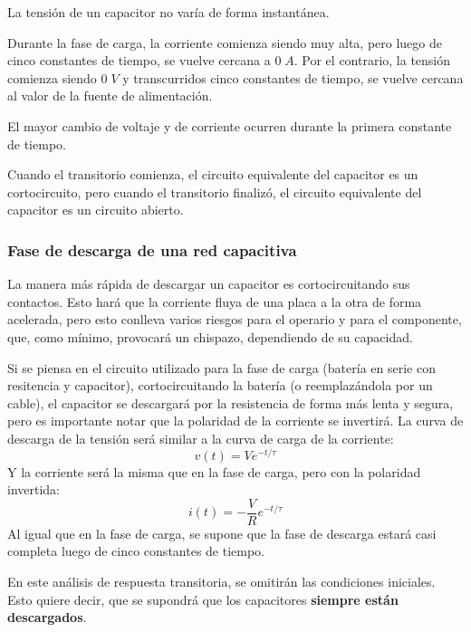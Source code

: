 \begin{conclusiones}
	La tensión de un capacitor no varía de forma instantánea.
		
	Durante la fase de carga, la corriente comienza siendo muy alta, pero luego de cinco constantes de tiempo, se vuelve cercana a $0\; A$. Por el contrario, la tensión comienza siendo $0\; V$ y transcurridos cinco constantes de tiempo, se vuelve cercana al valor de la fuente de alimentación.
	
	El mayor cambio de voltaje y de corriente ocurren durante la primera constante de tiempo.
	
	Cuando el transitorio comienza, el circuito equivalente del capacitor es un cortocircuito, pero cuando el transitorio finalizó, el circuito equivalente del capacitor es un circuito abierto.
\end{conclusiones}
\subsubsection{Fase de descarga de una red capacitiva}
La manera más rápida de descargar un capacitor es cortocircuitando sus contactos. Esto hará que la corriente fluya de una placa a la otra de forma acelerada, pero esto conlleva varios riesgos para el operario y para el componente, que, como mínimo, provocará un chispazo, dependiendo de su capacidad.

Si se piensa en el circuito utilizado para la fase de carga (batería en serie con resitencia y capacitor), cortocircuitando la batería (o reemplazándola por un cable), el capacitor se descargará por la resistencia de forma más lenta y segura, pero es importante notar que la polaridad de la corriente se invertirá. La curva de descarga de la tensión será similar a la curva de carga de la corriente:
\begin{equation}
	\label{eq:descarga_capacitor_v}
	v(t)=Ve^{-t / \tau}
\end{equation}
Y la corriente será la misma que en la fase de carga, pero con la polaridad invertida:
\begin{equation}
	\label{eq:descarga_capacitor_i}
	i(t)=-\frac{V}{R}e^{-t / \tau}
\end{equation}
Al igual que en la fase de carga, se supone que la fase de descarga estará casi completa luego de cinco constantes de tiempo.

En este análisis de respuesta transitoria, se omitirán las condiciones iniciales. Esto quiere decir, que se supondrá que los capacitores \textbf{siempre están descargados}.

